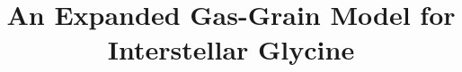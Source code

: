 \documentclass{aastex61}
\begin{document}
\title{An Expanded Gas-Grain Model for Interstellar Glycine} 


\end{document}
